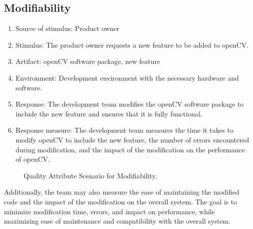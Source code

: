 \subsection{Modifiability\label{subSection::ModifiabilityQA}}
\begin{enumerate}
    \item Source of stimulus: Product owner
    \item Stimulus: The product owner requests a new feature to be added to openCV.
    \item Artifact: openCV software package, new feature
    \item Environment: Development environment with the necessary hardware and software.
    \item Response: The development team modifies the openCV software package to include the new feature and ensures that it is fully functional.
    \item Response measure: The development team measures the time it takes to modify openCV to include the new feature, the number of errors encountered during modification, and the impact of the modification on the performance of openCV.
\end{enumerate}
\begin{figure}[H]
\centering
{}
\caption{\label{Figure::Quality Attribute Scenario for Modifiability} Quality Attribute Scenario for Modifiability.}
\end{figure}
Additionally, the team may also measure the ease of maintaining the modified code and the impact of the modification on the overall system. The goal is to minimize modification time, errors, and impact on performance, while maximizing ease of maintenance and compatibility with the overall system.
